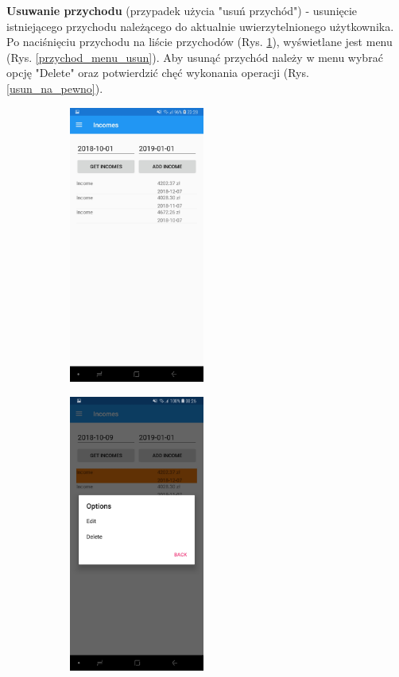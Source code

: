 \textbf{Usuwanie przychodu} (przypadek użycia "usuń przychód") - usunięcie istniejącego przychodu należącego do aktualnie uwierzytelnionego użytkownika. Po naciśnięciu przychodu na liście przychodów (Rys. \ref{przychody_lista_usun}), wyświetlane jest menu (Rys. \ref{przychod_menu_usun}). Aby usunąć przychód należy w menu wybrać opcję "Delete" oraz potwierdzić chęć wykonania operacji (Rys. \ref{usun_na_pewno}).
\begin{figure}[!ht]
	\begin{center}
		\begin{subfigure}[b]{0.3\textwidth}
			\includegraphics[width=1.75in]{img/mobile/przychody_gotowe.jpg}
			\label{przychody_lista_usun}
		\end{subfigure}
		\begin{subfigure}[b]{0.3\textwidth}
			\includegraphics[width=1.75in]{img/mobile/przychod_menu.jpg}

\end{subfigure}
\end{center}
\end{figure}
